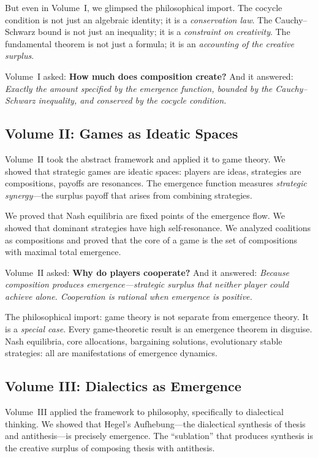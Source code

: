 But even in Volume~I, we glimpsed the philosophical import. The cocycle
condition is not just an algebraic identity; it is a \emph{conservation law}.
The Cauchy--Schwarz bound is not just an inequality; it is a \emph{constraint
on creativity}. The fundamental theorem is not just a formula; it is an
\emph{accounting of the creative surplus}.

Volume~I asked: \textbf{How much does composition create?} And it answered:
\emph{Exactly the amount specified by the emergence function, bounded by the
Cauchy--Schwarz inequality, and conserved by the cocycle condition.}

\subsection{Volume II: Games as Ideatic Spaces}

Volume~II took the abstract framework and applied it to game theory. We showed
that strategic games are ideatic spaces: players are ideas, strategies are
compositions, payoffs are resonances. The emergence function measures
\emph{strategic synergy}---the surplus payoff that arises from combining
strategies.

We proved that Nash equilibria are fixed points of the emergence flow. We
showed that dominant strategies have high self-resonance. We analyzed
coalitions as compositions and proved that the core of a game is the set of
compositions with maximal total emergence.

Volume~II asked: \textbf{Why do players cooperate?} And it answered: \emph{Because
composition produces emergence---strategic surplus that neither player could
achieve alone. Cooperation is rational when emergence is positive.}

The philosophical import: game theory is not separate from emergence theory.
It is a \emph{special case}. Every game-theoretic result is an emergence
theorem in disguise. Nash equilibria, core allocations, bargaining solutions,
evolutionary stable strategies: all are manifestations of emergence dynamics.

\subsection{Volume III: Dialectics as Emergence}

Volume~III applied the framework to philosophy, specifically to dialectical
thinking. We showed that Hegel's Aufhebung---the dialectical synthesis of
thesis and antithesis---is precisely emergence. The ``sublation'' that
produces synthesis is the creative surplus of composing thesis with antithesis.

